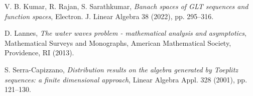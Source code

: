 \documentclass{amsart}
\begin{document}
\begin{thebibliography}{}


%
%
%






%
%

 V. B. Kumar, R. Rajan, S. Sarathkumar, {\it Banach spaces of GLT sequences and function spaces}, Electron. J. Linear Algebra 38 (2022), pp. 295–316.


 D. Lannes, {\it The water waves problem - mathematical analysis and asymptotics}, Mathematical Surveys and Monographs, American Mathematical Society, Providence, RI (2013).

 S. Serra-Capizzano, {\it Distribution results on the algebra generated by Toeplitz sequences: a finite dimensional approach}, Linear Algebra Appl. 328 (2001), pp. 121–130.



\end{thebibliography}
\end{document}
